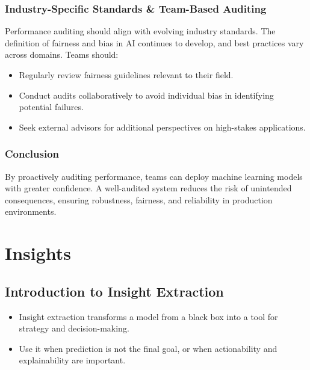 \documentclass[12pt,openany]{book}
\begin{document}
\section{Industry-Specific Standards \& Team-Based Auditing}
Performance auditing should align with evolving industry standards. The definition of fairness and bias in AI continues to develop, and best practices vary across domains. Teams should:
\begin{itemize}
    \item Regularly review fairness guidelines relevant to their field.
    \item Conduct audits collaboratively to avoid individual bias in identifying potential failures.
    \item Seek external advisors for additional perspectives on high-stakes applications.
\end{itemize}

\section{Conclusion}
By proactively auditing performance, teams can deploy machine learning models with greater confidence. A well-audited system reduces the risk of unintended consequences, ensuring robustness, fairness, and reliability in production environments.





\part{Insights}




\chapter{Introduction to Insight Extraction}

\begin{summarybox}
\begin{itemize}
  \item Insight extraction transforms a model from a black box into a tool for strategy and decision-making.
  \item Use it when prediction is not the final goal, or when actionability and explainability are important.
\end{itemize}
\end{summarybox}
\end{document}
